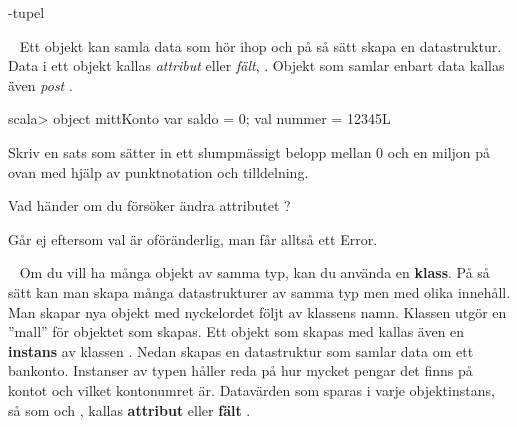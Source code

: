 -tupel


\QUESTEND









\QUESTBEGIN

\Task  \what~  Ett objekt kan samla data som hör ihop och på så sätt skapa en datastruktur. Data i ett objekt kallas \emph{attribut} eller \emph{fält}, . Objekt som samlar enbart data kallas även \emph{post} .
\begin{REPLnonum}
scala> object mittKonto { var saldo = 0; val nummer = 12345L }
\end{REPLnonum}
\Subtask Skriv en sats som sätter in ett slumpmässigt belopp mellan 0 och en miljon på  ovan med hjälp av punktnotation och tilldelning.

\Subtask Vad händer om du försöker ändra attributet ?

\SOLUTION


\TaskSolved \what
 

\SubtaskSolved   {}

\SubtaskSolved   Går ej eftersom val är oföränderlig, man får alltså ett Error.


\QUESTEND









\QUESTBEGIN

\Task  \what~  Om du vill ha många objekt av samma typ, kan du använda en \textbf{klass}. På så sätt kan man skapa många datastrukturer av samma typ men med olika innehåll. Man skapar nya objekt med nyckelordet  följt av klassens namn. Klassen utgör en ''mall'' för objektet som skapas. Ett objekt som skapas med  kallas även en \textbf{instans} av klassen . Nedan skapas en datastruktur  som samlar data om ett bankonto. Instanser av typen  håller reda på hur mycket pengar det finns på kontot och vilket kontonumret är. Datavärden som sparas i varje objektinstans, så som  och , kallas \textbf{attribut}  eller \textbf{fält} .


